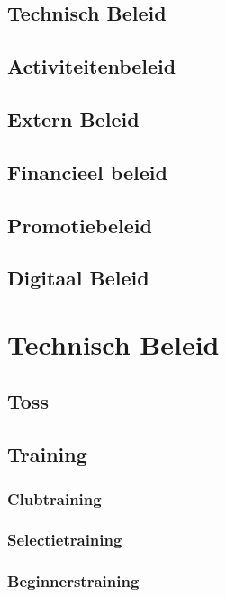 \documentclass[]{article}
\begin{document}
\subsection{Technisch Beleid}

\subsection{Activiteitenbeleid}

\subsection{Extern Beleid}

\subsection{Financieel beleid}

\subsection{Promotiebeleid}

\subsection{Digitaal Beleid}

\section{Technisch Beleid}
\subsection{Toss}

\subsection{Training}
\subsubsection{Clubtraining}

\subsubsection{Selectietraining}

\subsubsection{Beginnerstraining}
\end{document}
